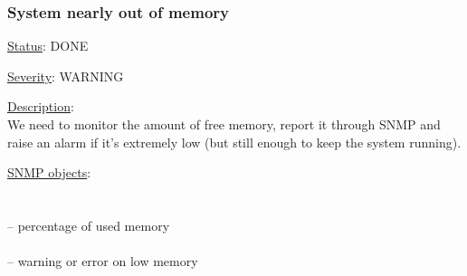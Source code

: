 \subsubsection{\bf System nearly out of memory}
		\label{fail:other:no_mem}
		\begin{pck_descr}
			\item [] \underline{Status}: DONE
			\item [] \underline{Severity}: WARNING
			\item [] \underline{Description}:\\
				We need to monitor the amount of free memory, report it through SNMP and
				raise an alarm if it's extremely low (but still enough to keep the
				system running).
			\item [] \underline{SNMP objects}:\\
        {\footnotesize
        \\
				\\
				 -- percentage of used memory\\
				\\
				 -- warning or error on low memory\\
				\\
         }
		\end{pck_descr}
